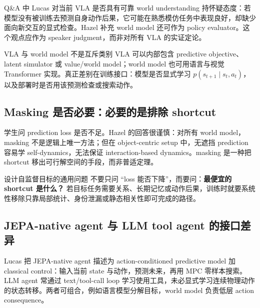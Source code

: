 \documentclass[a4paper]{article}
\begin{document}
Q\&A 中 Lucas 对当前 VLA 是否具有可靠 world understanding 持怀疑态度：若模型没有被训练去预测自身动作后果，它可能在熟悉模仿任务中表现良好，却缺少面向新交互的显式检查。Hazel 补充 world model 还可作为 policy evaluator。这个观点应作为 speaker judgment，而非对所有 VLA 的实证定论。


\begin{warningbox}{VLA 与 world model 不是互斥类别}
VLA 可以内部包含 predictive objective、latent simulator 或 value/world model；world model 也可用语言与视觉 Transformer 实现。真正差别在训练接口：模型是否显式学习 $p(s_{t+1}\mid s_t,a_t)$，以及部署时是否用该预测检查或搜索动作。
\end{warningbox}

\subsection{Masking 是否必要：必要的是排除 shortcut}

学生问 prediction loss 是否不足。Hazel 的回答很谨慎：对所有 world model，masking 不是逻辑上唯一方法；但在 object-centric setup 中，无遮挡 prediction 容易学 self-dynamics，无法保证 interaction-based dynamics。masking 是一种把 shortcut 移出可行解空间的手段，而非普适定理。


\begin{importantbox}{设计自监督目标的通用问题}
不要只问 ``loss 能否下降''，而要问：\textbf{最便宜的 shortcut 是什么？} 若目标任务需要关系、长期记忆或动作后果，训练时就要系统性移除只靠局部统计、身份泄漏或静态相关性即可完成的路径。
\end{importantbox}

\subsection{JEPA-native agent 与 LLM tool agent 的接口差异}

Lucas 把 JEPA-native agent 描述为 action-conditioned predictive model 加 classical control：输入当前 state 与动作，预测未来，再用 MPC 零样本搜索。LLM agent 常通过 text/tool-call loop 学习使用工具，未必显式学习连续物理动作的状态转移。两者可组合，例如语言模型分解目标，world model 负责低层 action consequence。
\end{document}
